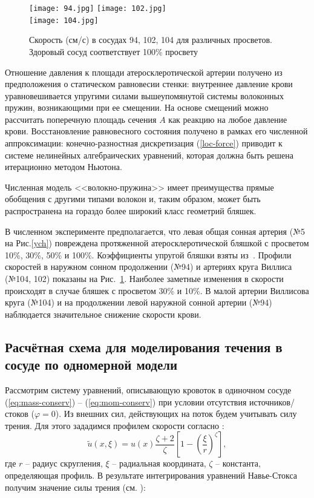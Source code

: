 \begin{figure}[h!]
\centering
\texttt{[image: 94.jpg]}
\texttt{[image: 102.jpg]}\\
\texttt{[image: 104.jpg]}
\caption{Скорость (см/с) в сосудах 94, 102, 104 для различных просветов. Здоровый сосуд
соответствует 100\% просвету}
\label{sc}
\end{figure}

Отношение давления к площади атеросклеротической артерии получено из предположения о статическом равновесии стенки: 
внутреннее давление крови уравновешивается упругими силами вышеупомянутой системы волоконных пружин, возникающими при ее смещении. 
На основе смещений можно рассчитать поперечную площадь сечения $A$ как реакцию на любое давление крови. 
Восстановление равновесного состояния получено в рамках его численной аппроксимации: конечно-разностная дискретизация (\ref{loc-force}) 
приводит к системе нелинейных алгебраических уравнений, которая должна быть решена итерационно методом Ньютона.

Численная модель <<волокно-пружина>> имеет преимущества прямые обобщения с другими типами волокон и, таким образом, 
может быть распространена на гораздо более широкий класс геометрий бляшек.

В численном эксперименте предполагается, что левая общая сонная артерия (№5 на Рис.\ref{ych}) повреждена протяженной атеросклеротической бляшкой 
с просветом 10\%, 30\%, 50\% и 100\%. Коэффициенты упругой бляшки взяты из~\cite{vassilevski:2011}. 
Профили скоростей в наружном сонном продолжении (№94) и артериях круга Виллиса (№104, 102) показаны на Рис.~\ref{sc}. 
Наиболее заметные изменения в скорости происходят в случае бляшек с просветом 30\% и 10\%. 
В малой артерии Виллисова круга (№104) и на продолжении левой наружной сонной артерии (№94) наблюдается значительное снижение скорости крови.


\subsection{Расчётная схема для моделирования течения в сосуде по одномерной модели}
Рассмотрим систему уравнений, описывающую кровоток в одиночном сосуде (\ref{eq:mass-conserv}) -- (\ref{eq:mom-conserv}) при условии
отсутствия источников/стоков ($\varphi=0$).
Из внешних сил, действующих на поток будем учитывать силу трения.
Для этого зададимся профилем скорости согласно \cite{smith:2002}:
$$
\tilde u(x, \xi) = u(x) \frac{\zeta + 2}{\zeta} \left[1 - \left(\frac{\xi}{r}\right)^\zeta\right],
$$
где $r$ -- радиус скругления, $\xi$ -- радиальная координата, $\zeta$ -- константа, определяющая профиль.
В результате интегрирования уравнений Навье-Стокса получим значение силы трения (см. \cite{boileau:2015}):

